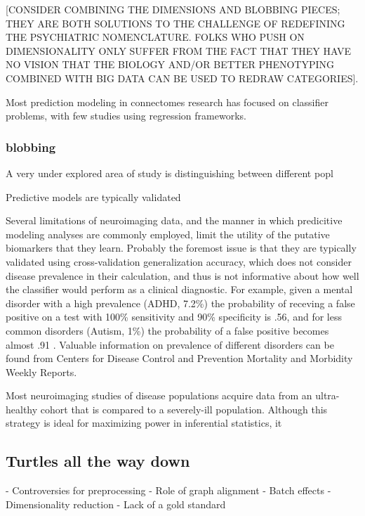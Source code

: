[CONSIDER COMBINING THE DIMENSIONS AND BLOBBING PIECES; THEY ARE BOTH SOLUTIONS TO THE CHALLENGE OF REDEFINING THE PSYCHIATRIC
NOMENCLATURE. FOLKS WHO PUSH ON DIMENSIONALITY ONLY SUFFER FROM THE FACT THAT THEY HAVE NO VISION THAT THE BIOLOGY AND/OR 
BETTER PHENOTYPING COMBINED WITH BIG DATA CAN BE USED TO REDRAW CATEGORIES].


Most prediction modeling in connectomes research has focused on classifier problems, with few studies using
regression frameworks. 

\subsubsection{blobbing}

A very under explored area of study is distinguishing between different popl

Predictive models are 
typically validated 


Several limitations of neuroimaging data, and the manner in which predicitive modeling analyses are 
commonly employed, limit the utility of the putative biomarkers that they learn. Probably the foremost
issue is that they are typically validated using cross-validation generalization accuracy, which does not
consider disease prevalence in their calculation, and thus is not informative about how well the classifier
would perform as a clinical diagnostic. For example, given a mental disorder with a high prevalence
(ADHD, 7.2\%) the probability of receving a false positive on a test with 100\% sensitivity and 90\% specificity
is .56, and for less common disorders (Autism, 1\%) the probability of a false positive becomes almost .91 \cite{grimes,altmanbland}.
Valuable information on prevalence of different disorders can be found from Centers for Disease Control and Prevention Mortality
and Morbidity Weekly Reports.  

Most neuroimaging studies of disease populations acquire data from an ultra-healthy cohort that is compared to
a severely-ill population. Although this strategy is ideal for maximizing power in inferential statistics, it 

\subsection{Turtles all the way down}

- Controversies for preprocessing
- Role of graph alignment
- Batch effects
- Dimensionality reduction
- Lack of a gold standard

